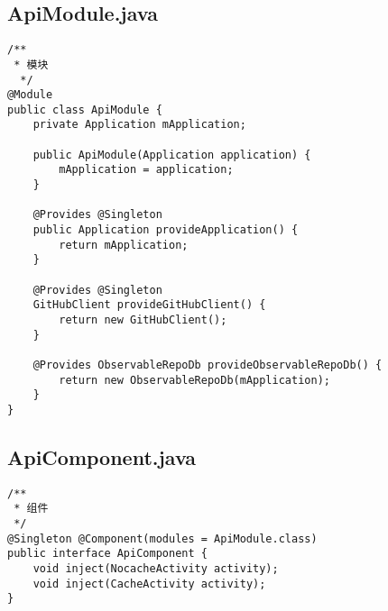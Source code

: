 \documentclass[9pt, b5paper]{article}
\begin{document}
\subsection{ApiModule.java}
\label{sec-6-2}
\begin{verbatim}
/**
 * 模块
  */
@Module
public class ApiModule {
    private Application mApplication;

    public ApiModule(Application application) {
        mApplication = application;
    }

    @Provides @Singleton
    public Application provideApplication() {
        return mApplication;
    }

    @Provides @Singleton
    GitHubClient provideGitHubClient() {
        return new GitHubClient();
    }

    @Provides ObservableRepoDb provideObservableRepoDb() {
        return new ObservableRepoDb(mApplication);
    }
}
\end{verbatim}
\subsection{ApiComponent.java}
\label{sec-6-3}
\begin{verbatim}
/**
 * 组件
 */
@Singleton @Component(modules = ApiModule.class)
public interface ApiComponent {
    void inject(NocacheActivity activity);
    void inject(CacheActivity activity);
}
\end{verbatim}
\end{document}
